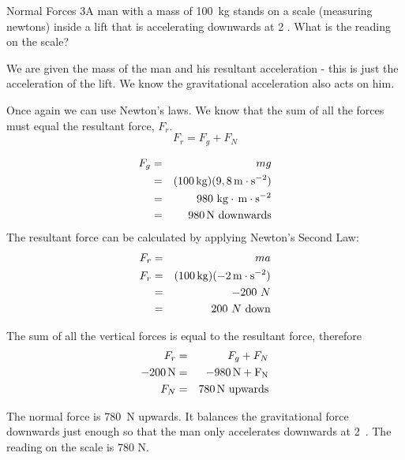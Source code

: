 \begin{wex}{Normal Forces 3}{A man with a mass of 100~kg stands on a scale (measuring newtons) inside a lift that is accelerating downwards at 2 \mss. What is the reading on the scale?}
{
We are given the mass of the man and his resultant acceleration - this is just the acceleration of the lift. We know the gravitational acceleration also acts on him.

Once again we can use Newton's laws. We know that the sum of all the forces must equal the resultant force, $F_r$.
\begin{equation*}
F_r=F_g+F_N
\end{equation*}

\begin{eqnarray*}
F_g&=&mg \\
&=& (100\,\mathrm{kg})(9,8\,\mathrm{m \cdot s^{-2}})\\
&=& 980\ \mathrm{kg\cdot\,\mathrm{m \cdot s^{-2}}} \\
&=& 980\,\rm{N}\ \mathrm{downwards}
\end{eqnarray*}
The resultant force can be calculated by applying Newton's Second Law:
\begin{eqnarray*}
F_r &=& ma\\
F_r &=& (100\,\mathrm{kg})(-2\,\mathrm{m \cdot s^{-2}})\\
&=& -200~N\\
&=& 200~N~\mbox{down}
\end{eqnarray*}

The sum of all the vertical forces is equal to the resultant force, therefore
\begin{eqnarray*}
F_r&=&F_g + F_N \\
-200\,\rm{N} &=& -980\,\rm{N} + F_N\\
F_N &=& 780\,\rm{N}\ \mathrm{upwards}
\end{eqnarray*}

The normal force is 780~N upwards. It balances the gravitational force downwards just enough so that the man only accelerates downwards at 2~\mss. The reading on the scale is 780 N.}
\end{wex}

